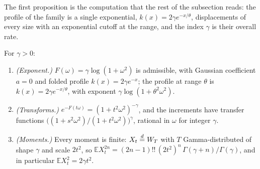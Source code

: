 The first proposition is the computation that the rest of the subsection reads: the profile
of the family is a single exponential,
$k(x) = 2\gamma e^{-x/\theta}$, displacements of every size with an exponential cutoff at the
range, and the index $\gamma$ is their overall rate.

\begin{proposition}\label{prop:matern-exponent}
For $\gamma > 0$:
\begin{enumerate}
\item \emph{(Exponent.)} $F(\omega) = \gamma\log(1 + \omega^2)$ is admissible, with Gaussian
coefficient $a = 0$ and folded profile $k(x) = 2\gamma e^{-x}$; the profile at range $\theta$ is
$k(x) = 2\gamma e^{-x/\theta}$, with exponent $\gamma\log(1 + \theta^2\omega^2)$.
\item \emph{(Transforms.)} $e^{-F(t\omega)} = (1 + t^2\omega^2)^{-\gamma}$, and the increments
have transfer functions $\bigl((1 + s^2\omega^2)/(1 + t^2\omega^2)\bigr)^{\gamma}$, rational in
$\omega$ for integer $\gamma$.
\item \emph{(Moments.)} Every moment is finite: $X_t \stackrel{d}{=} W_T$ with $T$ Gamma-distributed of
shape $\gamma$ and scale $2t^2$, so
$\mathbb{E}X_t^{2n} = (2n-1)!!\,(2t^2)^n\,\Gamma(\gamma+n)/\Gamma(\gamma)$, and in particular
$\mathbb{E}X_t^2 = 2\gamma t^2$.
\end{enumerate}
\end{proposition}


